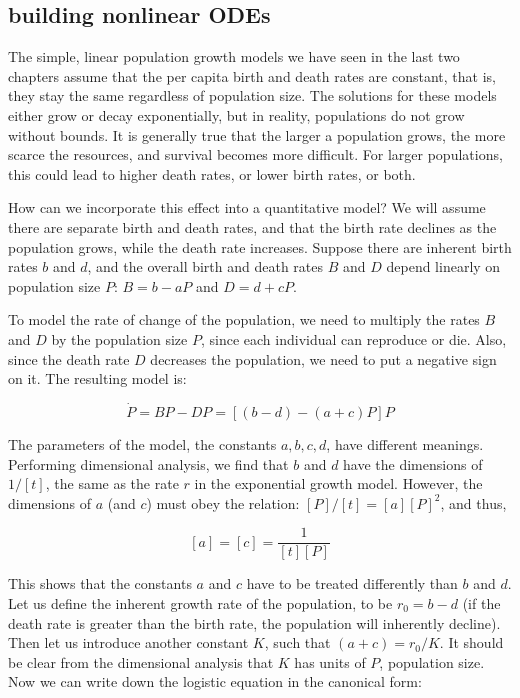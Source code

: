 \documentclass[
  letterpaper,
  DIV=11,
  numbers=noendperiod]{scrreprt}
\begin{document}
\hypertarget{building-nonlinear-odes}{%
\subsection{building nonlinear ODEs}\label{building-nonlinear-odes}}

\label{sec:model16}

The simple, linear population growth models we have seen in the last two
chapters assume that the per capita birth and death rates are constant,
that is, they stay the same regardless of population size. The solutions
for these models either grow or decay exponentially, but in reality,
populations do not grow without bounds. It is generally true that the
larger a population grows, the more scarce the resources, and survival
becomes more difficult. For larger populations, this could lead to
higher death rates, or lower birth rates, or both.

How can we incorporate this effect into a quantitative model? We will
assume there are separate birth and death rates, and that the birth rate
declines as the population grows, while the death rate increases.
Suppose there are inherent birth rates \(b\) and \(d\), and the overall
birth and death rates \(B\) and \(D\) depend linearly on population size
\(P\): \(B = b - aP\) and \(D = d + cP\).

To model the rate of change of the population, we need to multiply the
rates \(B\) and \(D\) by the population size \(P\), since each
individual can reproduce or die. Also, since the death rate \(D\)
decreases the population, we need to put a negative sign on it. The
resulting model is:

\[ 
\dot P = BP - DP = [(b-d)-(a+c)P]P 
\]

The parameters of the model, the constants \(a,b,c,d\), have different
meanings. Performing  dimensional analysis,
we find that \(b\) and \(d\) have the dimensions of \(1/[t]\), the same
as the rate \(r\) in the exponential growth model. However, the
dimensions of \(a\) (and \(c\)) must obey the relation:
\([P]/[t] = [a][P]^2\), and thus,

\[[a]=[c] = \frac{1}{[t][P]}\]

This shows that the constants \(a\) and \(c\) have to be treated
differently than \(b\) and \(d\). Let us define the inherent growth rate
of the population, to be \(r_0=b-d\) (if the death rate is greater than
the birth rate, the population will inherently decline). Then let us
introduce another constant \(K\), such that \((a+c)=r_0/K\). It should
be clear from the dimensional analysis that \(K\) has units of \(P\),
population size. Now we can write down the logistic equation in the
canonical form:
\end{document}

